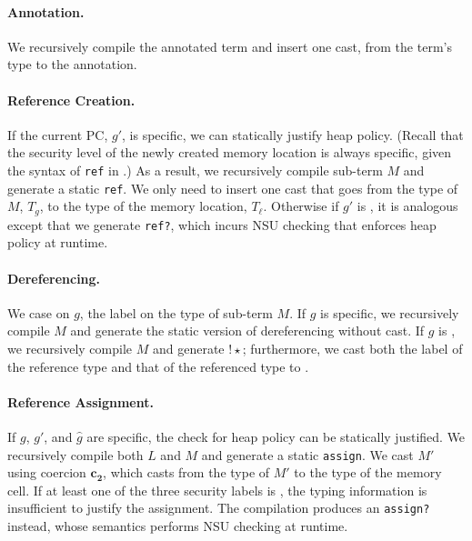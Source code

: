 {\paragraph{Annotation.}
We recursively compile the annotated term and insert one cast, from the term's
type to the annotation.

\paragraph{Reference Creation.}
If the current PC, $g'$, is specific, we can statically justify heap policy.
(Recall that the security level of the newly created memory location is always
specific, given the syntax of \texttt{ref} in \Surface.) As a result, we
recursively compile sub-term $M$ and generate a static \texttt{ref}. We only
need to insert one cast that goes from the type of $M$, $T_g$, to the type of
the memory location, $T_{\ell}$. Otherwise if $g'$ is \unk, it is analogous
except that we generate \texttt{ref?}, which incurs NSU checking that enforces
heap policy at runtime.

\paragraph{Dereferencing.} We case on $g$, the label on the type of sub-term $M$.
If $g$ is specific, we recursively compile $M$ and generate the static version
of dereferencing without cast. If $g$ is \unk, we recursively compile $M$ and
generate $\mathtt{!}{\star}$; furthermore, we cast both the label of the
reference type and that of the referenced type to \unk.

\paragraph{Reference Assignment.} If $g$, $g'$, and $\hat{g}$ are
specific, the check for heap policy can be statically justified. We recursively
compile both $L$ and $M$ and generate a static \texttt{assign}. We cast $M'$
using coercion $\bm{c_2}$, which casts from the type of $M'$ to the type of the
memory cell. If at least one of the three security labels is \unk, the typing
information is insufficient to justify the assignment. The compilation produces
an \texttt{assign?} instead, whose semantics performs NSU checking at runtime.

} %

